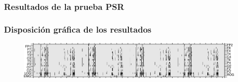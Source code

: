 \documentclass[11pt]{beamer}
\begin{document}

\begin{frame}[fragile]\frametitle{Resultados de la prueba PSR}
\begin{figure}
\scalebox{0.7}{\usebox{\caja}}
\end{figure}
\end{frame}


\begin{frame}\frametitle{Disposición gráfica de los resultados}
\begin{figure}
\includegraphics[width=\textwidth]{./img_ejemplos/MJNNVIGILOS_est.png}
\end{figure}
\end{frame}

\end{document}
